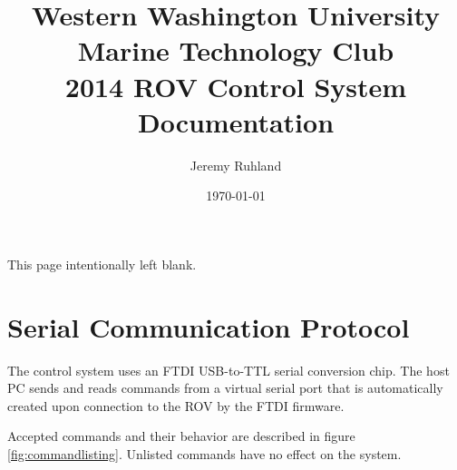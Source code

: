 \documentclass{article}
\title{Western Washington University Marine Technology Club\\2014 ROV Control System Documentation}
\author{Jeremy Ruhland}
\date{\today}
\begin{document}
\maketitle
\null
\pagebreak
\vspace*{\fill}
\hfill
\begin{center}
This page intentionally left blank.
\end{center}
\pagebreak

\section*{Serial Communication Protocol}
The control system uses an FTDI USB-to-TTL serial conversion chip. The host PC sends and reads commands from a virtual serial port that is automatically created upon connection to the ROV by the FTDI firmware.

Accepted commands and their behavior are described in figure \ref{fig:commandlisting}. Unlisted commands have no effect on the system.
\end{document}
